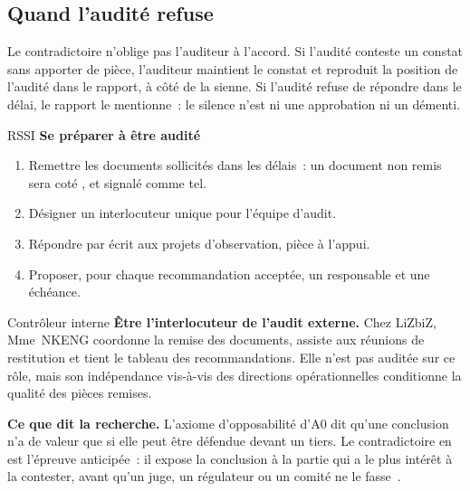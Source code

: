 \subsection{Quand l'audité refuse}

Le contradictoire n'oblige pas l'auditeur à l'accord. Si l'audité conteste
un constat sans apporter de pièce, l'auditeur maintient le constat et
reproduit la position de l'audité dans le rapport, à côté de la sienne. Si
l'audité refuse de répondre dans le délai, le rapport le mentionne~: le
silence n'est ni une approbation ni un démenti.

\begin{boxmetier}{RSSI}
\textbf{Se préparer à être audité}
\begin{enumerate}
    \item Remettre les documents sollicités dans les délais~: un document
          non remis sera coté \NEK{}, et signalé comme tel.
    \item Désigner un interlocuteur unique pour l'équipe d'audit.
    \item Répondre par écrit aux projets d'observation, pièce à l'appui.
    \item Proposer, pour chaque recommandation acceptée, un responsable et
          une échéance.
\end{enumerate}
\end{boxmetier}

\begin{boxmetier}{Contrôleur interne}
\textbf{Être l'interlocuteur de l'audit externe.} Chez LiZbiZ,
Mme~NKENG coordonne la remise des documents, assiste aux réunions de
restitution et tient le tableau des recommandations. Elle n'est pas
auditée sur ce rôle, mais son indépendance vis-à-vis des directions
opérationnelles conditionne la qualité des pièces remises.
\end{boxmetier}

\begin{boxinfo}
\textbf{Ce que dit la recherche.} L'axiome d'opposabilité d'A0 dit qu'une
conclusion n'a de valeur que si elle peut être défendue devant un tiers.
Le contradictoire en est l'épreuve anticipée~: il expose la conclusion à la
partie qui a le plus intérêt à la contester, avant qu'un juge, un
régulateur ou un comité ne le fasse~\cite{minka2026auditologie}.
\end{boxinfo}

\separateur


